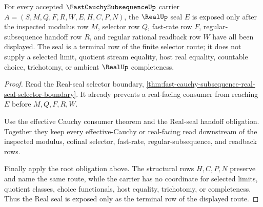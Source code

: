 \begin{theorem}
\label{thm:fast-cauchy-subsequence-real-seal-obligation}
For every accepted $\FastCauchySubsequenceUp$ carrier $A=(S,M,Q,F,R,W,E,H,C,P,N)$, the $\RealUp$ seal $E$ is exposed only after the inspected modulus row $M$, selector row $Q$, fast-rate row $F$, regular-subsequence handoff row $R$, and regular rational readback row $W$ have all been displayed. The seal is a terminal row of the finite selector route; it does not supply a selected limit, quotient stream equality, host real equality, countable choice, trichotomy, or ambient $\RealUp$ completeness.
\end{theorem}
\begin{proof}
Read the Real-seal selector boundary, \autoref{thm:fast-cauchy-subsequence-real-seal-selector-boundary}. It already prevents a real-facing consumer from reaching $E$ before $M,Q,F,R,W$.

Use the effective Cauchy consumer theorem and the Real-seal handoff obligation. Together they keep every effective-Cauchy or real-facing read downstream of the inspected modulus, cofinal selector, fast-rate, regular-subsequence, and readback rows.

Finally apply the root obligation above. The structural rows $H,C,P,N$ preserve and name the same route, while the carrier has no coordinate for selected limits, quotient classes, choice functionals, host equality, trichotomy, or completeness. Thus the Real seal is exposed only as the terminal row of the displayed route.
\end{proof}

